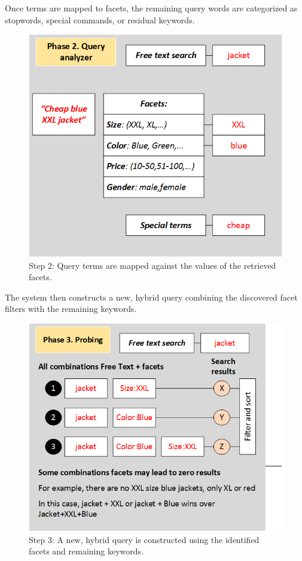 \documentclass{article}
\begin{document}
    Once terms are mapped to facets, the remaining query words are categorized as stopwords, special commands, or residual keywords.
    \begin{figure}[H]
        \centering
        \includegraphics[width=0.8\columnwidth]{searchimproved3.png}
        \caption{Step 2: Query terms are mapped against the values of the retrieved facets.}
        \label{fig:process_flow2}
    \end{figure}

    The system then constructs a new, hybrid query combining the discovered facet filters with the remaining keywords.
    \begin{figure}[H]
        \centering
        \includegraphics[width=0.8\columnwidth]{searchimproved4-1.png}
        \caption{Step 3: A new, hybrid query is constructed using the identified facets and remaining keywords.}
        \label{fig:process_flow3}
    \end{figure}
\end{document}
